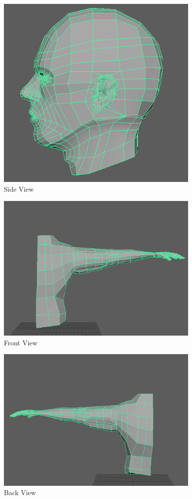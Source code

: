 \documentclass[a4paper]{article}
\begin{document}
\begin{figure}[h]
\centering
\includegraphics[width=10cm]{img/Side.png}
\caption{Side View}
\label{fig:Side View}
\end{figure}


\begin{figure}[h]
\centering
\includegraphics[width=10cm]{img/Front1.png}
\caption{Front View}
\label{fig:Front View}
\end{figure}

\begin{figure}[h]
\centering
\includegraphics[width=10cm]{img/Back1.png}
\caption{Back View}
\label{fig:Angle View}
\end{figure}
\end{document}
